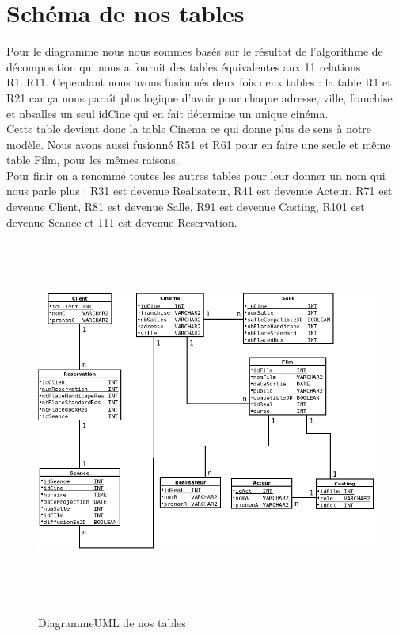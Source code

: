 \documentclass[a4paper,sffamily,12pt]{article}
\begin{document}
			\vspace{0.5cm}
		
		\section{Schéma de nos tables}

			\vspace{0.5cm}
					
		Pour le diagramme nous nous sommes basés sur le résultat de l'algorithme de décomposition qui nous a fournit des tables équivalentes aux 11 relations R1..R11. Cependant nous avons fusionnés deux fois deux tables : la table R1 et R21 car ça nous paraît plus logique d'avoir pour chaque adresse, ville, franchise et nbsalles un seul idCine qui en fait détermine un unique cinéma.\\
		\indent Cette table devient donc la table Cinema ce qui donne plus de sens à notre modèle. Nous avons aussi fusionné R51 et R61 pour en faire une seule et même table Film, pour les mêmes raisons.\\
		\indent Pour finir on a renommé toutes les autres tables pour leur donner un nom qui nous parle plus : R31 est devenue Realisateur, R41 est devenue Acteur, R71 est devenue Client, R81 est devenue Salle, R91 est devenue Casting, R101 est devenue Seance et 111 est devenue Reservation.

				\begin{figure}[!h]		
					\hspace{-0.5cm}
					{\includegraphics[height=12cm]{picture/DiagrammeUML.png}}
					\caption{DiagrammeUML de nos tables}
					\label{UML}
					\vspace{0.5cm}	
				\end{figure}		
\end{document}
